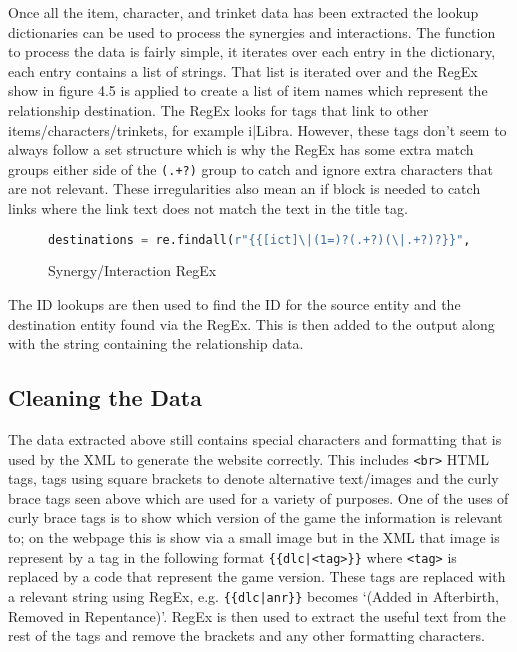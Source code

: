 Once all the item, character, and trinket data has been extracted the lookup dictionaries can be used to process the synergies and interactions. 
The function to process the data is fairly simple, it iterates over each entry in the dictionary, each entry contains a list of strings. That list is iterated over 
and the RegEx show in figure 4.5 is applied to create a list of item names which represent the relationship destination. The RegEx looks for tags that link to other items/characters/trinkets,
for example {{i|Libra}}. However, these tags don't seem to always follow a set structure which is why the RegEx has some extra match groups either side of the \verb|(.+?)| group to catch and ignore extra 
characters that are not relevant. These irregularities also mean an if block is needed to catch links where the link text does not match the text in the title tag.
\begin{figure}[H]
    \begin{lstlisting}[language=Python]
        destinations = re.findall(r"{{[ict]\|(1=)?(.+?)(\|.+?)?}}", relationship[0], re.IGNORECASE)
    \end{lstlisting}
    \caption{Synergy/Interaction RegEx}
\end{figure}
The ID lookups are then used to find the ID for the source entity and the destination entity found via the RegEx. This is then added to the output along with the string containing the relationship data.
\subsection{Cleaning the Data}
The data extracted above still contains special characters and formatting that is used by the XML to generate the website correctly. 
This includes \verb|<br>| HTML tags, tags using square brackets to denote alternative text/images and the curly brace tags seen above which are used for a variety of purposes.
One of the uses of curly brace tags is to show which version of the game the information is relevant to; on the webpage this is show via a small image but in the XML
that image is represent by a tag in the following format \verb#{{dlc|<tag>}}# where \verb|<tag>| is replaced by a code that represent the game version.
These tags are replaced with a relevant string using RegEx, e.g. \verb#{{dlc|anr}}# becomes `(Added in Afterbirth, Removed in Repentance)'.
RegEx is then used to extract the useful text from the rest of the tags and remove the brackets and any other formatting characters.

